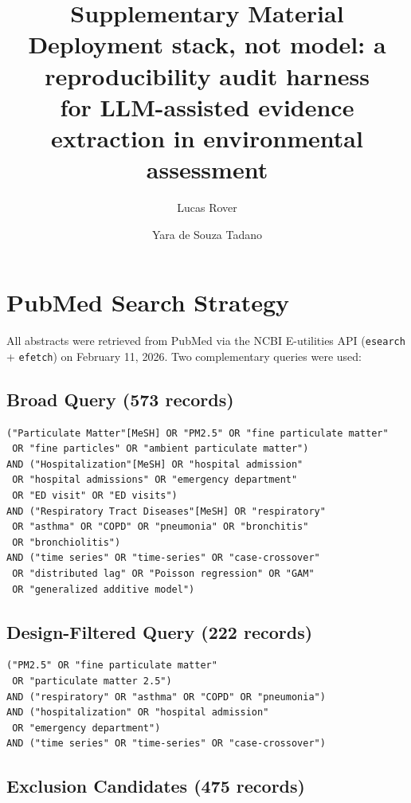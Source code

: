 \documentclass[11pt]{article}
\title{Supplementary Material\\[0.5em]
\large Deployment stack, not model: a reproducibility audit harness\\
for LLM-assisted evidence extraction in environmental assessment}
\author{Lucas Rover \and Yara de Souza Tadano}
\date{}
\begin{document}
\maketitle
\tableofcontents
\newpage

\section{PubMed Search Strategy}
\label{sec:search}

All abstracts were retrieved from PubMed via the NCBI E-utilities API (\texttt{esearch} + \texttt{efetch}) on February 11, 2026.
Two complementary queries were used:

\subsection{Broad Query (573 records)}

\begin{lstlisting}[language={},caption={PubMed broad search query}]
("Particulate Matter"[MeSH] OR "PM2.5" OR "fine particulate matter"
 OR "fine particles" OR "ambient particulate matter")
AND ("Hospitalization"[MeSH] OR "hospital admission"
 OR "hospital admissions" OR "emergency department"
 OR "ED visit" OR "ED visits")
AND ("Respiratory Tract Diseases"[MeSH] OR "respiratory"
 OR "asthma" OR "COPD" OR "pneumonia" OR "bronchitis"
 OR "bronchiolitis")
AND ("time series" OR "time-series" OR "case-crossover"
 OR "distributed lag" OR "Poisson regression" OR "GAM"
 OR "generalized additive model")
\end{lstlisting}

\subsection{Design-Filtered Query (222 records)}

\begin{lstlisting}[language={},caption={PubMed design-filtered query}]
("PM2.5" OR "fine particulate matter"
 OR "particulate matter 2.5")
AND ("respiratory" OR "asthma" OR "COPD" OR "pneumonia")
AND ("hospitalization" OR "hospital admission"
 OR "emergency department")
AND ("time series" OR "time-series" OR "case-crossover")
\end{lstlisting}

\subsection{Exclusion Candidates (475 records)}
\end{document}
